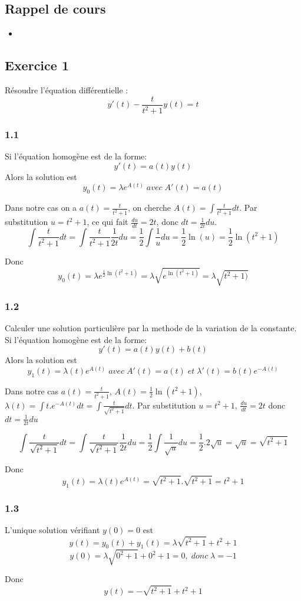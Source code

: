 \documentclass[]{book}
\theoremstyle{definition}
\begin{document}
\subsection*{Rappel de cours}

\begin{itemize}
\item 
\end{itemize}

\subsection*{Exercice 1}
R\'esoudre l'\'equation diff\'erentielle :
$$y'(t) - \frac{t}{t^2+1}y(t) = t$$

\subsubsection*{1.1}
Si l'\'equation homog\`ene est de la forme:
$$y'(t) = a(t)y(t)$$
Alors la solution est
$$y_0(t) = \lambda e^{A(t)}\; avec\; A'(t) = a(t)$$

Dans notre cas on a $a(t) = \frac{t}{t^2+1}$, on cherche $A(t) = \int{\frac{t}{t^2+1}dt}$.
Par substitution $u = t^2 +1$, ce qui fait $\frac{du}{dt} = 2t$, donc $dt = \frac{1}{2t}du$.
$$\int{\frac{t}{t^2+1}dt} = \int{\frac{t}{t^2+1}\frac{1}{2t}du} = \frac{1}{2}\int{\frac{1}{u}du} = \frac{1}{2}\ln(u) = \frac{1}{2}\ln(t^2+1)$$

Donc
$$y_0(t) = \lambda e^{\frac{1}{2}\ln(t^2+1)} = \lambda \sqrt{e^{\ln(t^2+1)}} = \lambda \sqrt{t^2+1)}$$

\subsubsection*{1.2}
Calculer une solution particuli\`ere par la methode de la variation de la constante.
Si l'\'equation homog\`ene est de la forme:
$$y'(t) = a(t)y(t) + b(t)$$
Alors la solution est
$$y_1(t) = \lambda(t) e^{A(t)}\; avec\; A'(t) = a(t)\; et\; \lambda'(t) = b(t)e^{-A(t)}$$

Dans notre cas $a(t) = \frac{t}{t^2+1}$, $A(t) = \frac{1}{2}\ln(t^2+1)$, $\lambda(t) = \int{t.e^{-A(t)}dt} = \int{\frac{t}{\sqrt{t^2+1}}dt}$.
Par substitution $u = t^2+1$, $\frac{du}{dt} = 2t$ donc $dt = \frac{1}{2t}du$

$$\int{\frac{t}{\sqrt{t^2+1}}dt} = \int{\frac{t}{\sqrt{t^2+1}}\frac{1}{2t}du} = \frac{1}{2}\int{\frac{1}{\sqrt{u}}du} = \frac{1}{2}.2\sqrt{u} = \sqrt{u} = \sqrt{t^2+1}$$

Donc
$$y_1(t) = \lambda(t) e^{A(t)} = \sqrt{t^2+1} . \sqrt{t^2+1} = t^2+1$$

\subsubsection*{1.3}
L'unique solution v\'erifiant $y(0)= 0$ est
$$y(t) = y_0(t) + y_1(t) = \lambda\sqrt{t^2+1} + t^2+1$$
$$y(0) = \lambda\sqrt{0^2+1} + 0^2+1 = 0,\; donc\; \lambda = -1$$

Donc
$$y(t) = -\sqrt{t^2+1} + t^2+1$$
\end{document}
